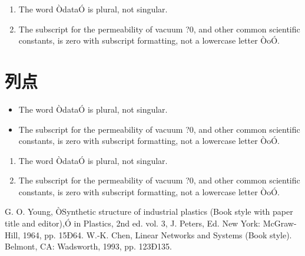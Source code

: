 \documentclass[letterpaper, 10pt, conference, twoside]{ieeeconf}
\begin{document}
\begin{enumerate}
\item The word ÒdataÓ is plural, not singular.
\item The subscript for the permeability of vacuum ?0, and other common scientific constants, is zero with subscript formatting, not a lowercase letter ÒoÓ.
\end{enumerate}

\section{列点}

\begin{itemize}
\item The word ÒdataÓ is plural, not singular.
\item The subscript for the permeability of vacuum ?0, and other common scientific constants, is zero with subscript formatting, not a lowercase letter ÒoÓ.
\end{itemize}

\begin{enumerate}
\item The word ÒdataÓ is plural, not singular.
\item The subscript for the permeability of vacuum ?0, and other common scientific constants, is zero with subscript formatting, not a lowercase letter ÒoÓ.
\end{enumerate}


\begin{thebibliography}{99}

 G. O. Young, ÒSynthetic structure of industrial plastics (Book style with paper title and editor),Ó 	in Plastics, 2nd ed. vol. 3, J. Peters, Ed.  New York: McGraw-Hill, 1964, pp. 15Ð64.
 W.-K. Chen, Linear Networks and Systems (Book style).	Belmont, CA: Wadsworth, 1993, pp. 123Ð135.

\end{thebibliography}
\end{document}
